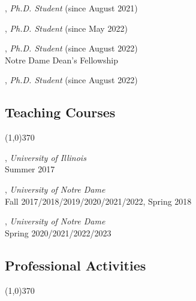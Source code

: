 \documentclass[10pt]{article}
\newenvironment{myindentpar}[1]%
{\begin{list}{}%
         {\setlength{\leftmargin}{#1}}%
         \item[]%
}
{\end{list}}
\newcounter{list}
\begin{document}
\begin{myindentpar}{0.75cm}
\hspace{-0.75cm}{\bf Zhihan Zhang}, \textit{Ph.D. Student} (since August 2021)

\hspace{-0.75cm}{\bf Noah Ziems}, \textit{Ph.D. Student} (since May 2022)

\hspace{-0.75cm}{\bf Eric Inae}, \textit{Ph.D. Student} (since August 2022) \\
	{Notre Dame Dean's Fellowship}

\hspace{-0.75cm}{\bf Hy Dang}, \textit{Ph.D. Student} (since August 2022)

\end{myindentpar}

\subsection{\sc Teaching Courses}
\vspace{-0.4cm} \line(1,0){370} \vspace{-0.1cm}

\begin{myindentpar}{0.75cm}

\hspace{-0.75cm}{\bf CS 412 Introduction to Data Mining}, \textit{University of Illinois} \\
	Summer 2017
	
\hspace{-0.75cm}{\bf CSE 40647/60647 Data Science}, \textit{University of Notre Dame}  \\
	Fall 2017/2018/2019/2020/2021/2022, Spring 2018

\hspace{-0.75cm}{\bf CSE 60326 Computational Behavior Modeling}, \textit{University of Notre Dame} \\
	Spring 2020/2021/2022/2023

\end{myindentpar}

\subsection{\sc Professional Activities}
\vspace{-0.4cm} \line(1,0){370} \vspace{-0.1cm}
\end{document}
